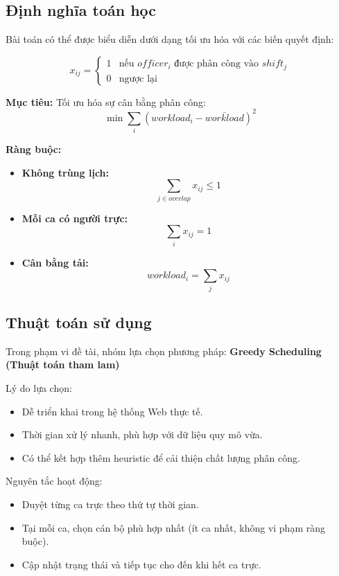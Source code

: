 \documentclass[18pt,a4paper]{report}
\begin{document}
\subsection{Định nghĩa toán học}
Bài toán có thể được biểu diễn dưới dạng tối ưu hóa với các biến quyết định:

\[
x_{ij} =
\begin{cases}
1 & \text{nếu } officer_i \text{ được phân công vào } shift_j \\
0 & \text{ngược lại}
\end{cases}
\]

\textbf{Mục tiêu:}
Tối ưu hóa sự cân bằng phân công:
\[
\min \sum_i (workload_i - \bar{workload})^2
\]

\textbf{Ràng buộc:}
\begin{itemize}[leftmargin=1.2cm]
    \item \textbf{Không trùng lịch:}
    \[
    \sum_{j \in overlap} x_{ij} \leq 1
    \]
    \item \textbf{Mỗi ca có người trực:}
    \[
    \sum_i x_{ij} = 1
    \]
    \item \textbf{Cân bằng tải:}
    \[
    workload_i = \sum_j x_{ij}
    \]
\end{itemize}

\subsection{Thuật toán sử dụng}
Trong phạm vi đề tài, nhóm lựa chọn phương pháp: \textbf{Greedy Scheduling (Thuật toán tham lam)}

Lý do lựa chọn:
\begin{itemize}[leftmargin=1.2cm]
    \item Dễ triển khai trong hệ thống Web thực tế.
    \item Thời gian xử lý nhanh, phù hợp với dữ liệu quy mô vừa.
    \item Có thể kết hợp thêm heuristic để cải thiện chất lượng phân công.
\end{itemize}

Nguyên tắc hoạt động:
\begin{itemize}[leftmargin=1.2cm]
    \item Duyệt từng ca trực theo thứ tự thời gian.
    \item Tại mỗi ca, chọn cán bộ phù hợp nhất (ít ca nhất, không vi phạm ràng buộc).
    \item Cập nhật trạng thái và tiếp tục cho đến khi hết ca trực.
\end{itemize}
\end{document}
